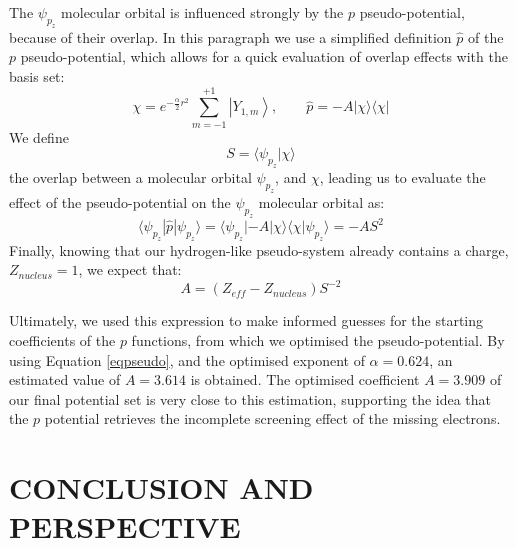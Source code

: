 \documentclass[12pt]{article}
\begin{document}
The \(\psi_{p_{z}}\) molecular orbital is influenced strongly by the $p$ pseudo-potential,
because of their overlap. In this paragraph we use a simplified definition $\widehat{p}$ of the $p$ pseudo-potential, which allows for a quick evaluation of overlap effects with the basis set: 
\begin{equation}
\chi = e^{-\frac{\alpha}{2} r^{2}}\sum_{m=-1}^{+1}\left|Y_{1,m}\right>,\qquad \widehat{p} = -A | \chi \rangle \langle \chi |
\end{equation}
We define
\begin{equation}
S = \langle \psi_{p_{z}} | \chi \rangle
\end{equation}
the overlap between a molecular orbital \(\psi_{p_{z}}\), and \(\chi\),
leading us to evaluate the effect of the pseudo-potential on the \(\psi_{p_{z}}\) molecular orbital as:
\begin{equation}
\langle \psi_{p_{z}} | \widehat{p} | \psi_{p_{z}} \rangle = \langle \psi_{p_{z}} | -A | \chi \rangle \langle \chi | \psi_{p_{z}} \rangle = -A S^{2}
\end{equation}
Finally, knowing that our hydrogen-like pseudo-system already contains a charge, \(Z_{nucleus}=1\), 
we expect that:
\begin{equation}
A = (Z_{eff} - Z_{nucleus})S^{-2}
\label{eqpseudo}
\end{equation}

Ultimately, we used this expression to make informed guesses for the starting coefficients of the $p$ functions, from which we optimised the pseudo-potential.
By using Equation \ref{eqpseudo}, and the optimised exponent of $\alpha=0.624$, an estimated value of $A=3.614$ is obtained.  
The optimised coefficient $A=3.909$ of our final potential set is very close to this estimation, 
supporting the idea that the $p$ potential retrieves the incomplete screening effect of the missing electrons. 

\section*{\sffamily \Large CONCLUSION AND PERSPECTIVE}
\end{document}
